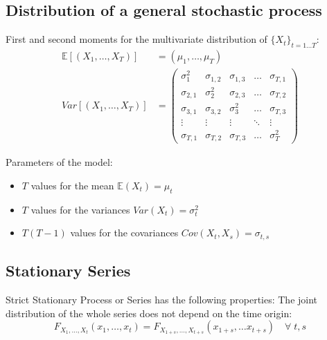 \subsection{Distribution of a general stochastic process}

First and second moments for the multivariate distribution of $\{X_t\}_{t=1\dots T}$:
\begin{align*}
	\mathbb{E}[(X_1, \dots, X_T)] & = (\mu_1, \dots, \mu_T)                                              \\
	Var[(X_1, \dots, X_T)]        & = \begin{pmatrix}
		                                  \sigma_1^2   & \sigma_{1,2} & \sigma_{1,3} & \dots  & \sigma_{T,1} \\
		                                  \sigma_{2,1} & \sigma_2^2   & \sigma_{2,3} & \dots  & \sigma_{T,2} \\
		                                  \sigma_{3,1} & \sigma_{3,2} & \sigma_3^2   & \dots  & \sigma_{T,3} \\
		                                  \vdots       & \vdots       & \vdots       & \ddots & \vdots       \\
		                                  \sigma_{T,1} & \sigma_{T,2} & \sigma_{T,3} & \dots  & \sigma_T^2
	                                  \end{pmatrix}
\end{align*}

Parameters of the model:
\begin{itemize}
	\item $T$ values for the mean $\mathbb{E}(X_t) = \mu_t$
	\item $T$ values for the variances $Var(X_t) = \sigma_t^2$
	\item $T(T-1)$ values for the covariances $Cov(X_t, X_s) = \sigma_{t,s}$
\end{itemize}

\subsection{Stationary Series}

Strict Stationary Process or Series has the following properties:
The joint distribution of the whole series does not depend on the time
origin:
\begin{equation}
	F_{X_1, \dots, X_t}(x_1, \dots, x_t) = F_{X_{1+s}, \dots, X_{t+s}}(x_{1+s}, \dots x_{t+s}) \quad \forall\; t,s
\end{equation}

